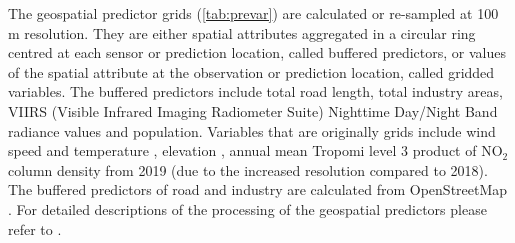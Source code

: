 \documentclass{article}
\begin{document}
The geospatial predictor grids (\cref{tab:prevar}) are calculated or re-sampled at 100 m resolution. They are either spatial attributes aggregated in a circular ring centred at each sensor or prediction location, called buffered predictors, or values of the spatial attribute at the observation or prediction location, called gridded variables. The buffered predictors include total road length, total industry areas, VIIRS (Visible Infrared Imaging Radiometer Suite) Nighttime Day/Night Band radiance values \citep[nightlight,][]{nightlight} and population. Variables that are originally grids include wind speed and temperature \citep{dee2011era}, elevation \citep{elevation}, annual mean Tropomi level 3 product of NO$_2$ column density  \citep{TROPOMIgee} from 2019 (due to the increased resolution compared to 2018). The buffered predictors of road and industry are calculated from OpenStreetMap  \citep{openstreetmap}. For detailed descriptions of the processing of the geospatial predictors please refer to \cite{luglobal}.   
\end{document}
